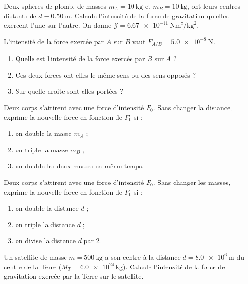 \documentclass[11pt,a4paper]{article}
\begin{document}

\begin{exo}
Deux sphères de plomb, de masses $m_A=\qty{10}{\kilogram}$ et
$m_B=\qty{10}{\kilogram}$, ont leurs centres distants de $d=\qty{0.50}{\metre}$.
Calcule l'intensité de la force de gravitation qu'elles exercent l'une sur l'autre.
On donne $\mathcal{G}=\num{6.67e-11}\ \si{\newton\metre\squared\per\kilogram\squared}$.
\end{exo}

\begin{exo}
L'intensité de la force exercée par $A$ sur $B$ vaut $F_{A/B}=\qty{5.0e-8}{\newton}$.
\begin{enumerate}[label=\alph*)]
  \item Quelle est l'intensité de la force exercée par $B$ sur $A$ ?
  \item Ces deux forces ont-elles le même sens ou des sens opposés ?
  \item Sur quelle droite sont-elles portées ?
\end{enumerate}
\end{exo}

\begin{exo}
Deux corps s'attirent avec une force d'intensité $F_0$. Sans changer la distance,
exprime la nouvelle force en fonction de $F_0$ si :
\begin{enumerate}[label=\alph*)]
  \item on double la masse $m_A$ ;
  \item on triple la masse $m_B$ ;
  \item on double les deux masses en même temps.
\end{enumerate}
\end{exo}

\begin{exo}
Deux corps s'attirent avec une force d'intensité $F_0$. Sans changer les masses,
exprime la nouvelle force en fonction de $F_0$ si :
\begin{enumerate}[label=\alph*)]
  \item on double la distance $d$ ;
  \item on triple la distance $d$ ;
  \item on divise la distance $d$ par $2$.
\end{enumerate}
\end{exo}

\begin{exo}
Un satellite de masse $m=\qty{500}{\kilogram}$ a son centre à la distance
$d=\qty{8.0e6}{\metre}$ du centre de la Terre ($M_T=\qty{6.0e24}{\kilogram}$).
Calcule l'intensité de la force de gravitation exercée par la Terre sur le satellite.
\end{exo}
\end{document}
